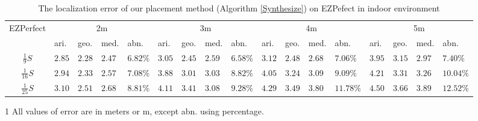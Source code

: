 \documentclass[10pt, conference, letterpaper]{IEEEtran}
\begin{document}
\begin{table*}[!t]
\renewcommand{\arraystretch}{1.0}
\caption{The localization error of our placement method (Algorithm \ref{Synthesize}) on EZPefect in indoor environment} \label{experiment_error_EZPefect}
\centering
\begin{threeparttable}
\begin{tabular}{|c|p{0.5cm}|p{0.5cm}|p{0.5cm}|p{0.6cm}|p{0.5cm}|p{0.5cm}|p{0.5cm}|p{0.6cm}|p{0.5cm}|p{0.5cm}|p{0.5cm}|p{0.6cm}|p{0.5cm}|p{0.5cm}|p{0.5cm}|p{0.6cm}|}
  \hline
\multirow{2}{*}{EZPerfect} & \multicolumn{4}{c|}{2m} & \multicolumn{4}{c|}{3m} & \multicolumn{4}{c|}{4m} & \multicolumn{4}{c|}{5m} \\
  \cline{2-17} & ari. & geo. & med. & abn. & ari. & geo. & med. & abn. & ari. & geo. & med. & abn. & ari. & geo. & med. & abn. \\
  \hline
  $\frac{1}{9}S$ & $2.85$ & $2.28$ & $2.47$ & $6.82\%$ & $3.05$ & $2.45$ & $2.59$ & $6.58\%$ & $3.12$ & $2.48$ & $2.68$ & $7.06\%$ & $3.95$ & $3.15$ & $2.97$ & $7.40\%$ \\
  \hline
  $\frac{1}{16}S$ & $2.94$ & $2.33$ & $2.57$ & $7.08\%$ & $3.88$ & $3.01$ & $3.03$ & $8.82\%$ & $4.05$ & $3.24$ & $3.09$ & $9.09\%$ & $4.21$ & $3.31$ & $3.26$ & $10.04\%$ \\
  \hline
  $\frac{1}{25}S$ & $3.10$ & $2.51$ & $2.68$ & $8.81\%$ & $4.11$ & $3.41$ & $3.08$ & $9.28\%$ & $4.29$ & $3.49$ & $3.80$ & $11.78\%$ & $4.50$ & $3.66$ & $3.89$ & $12.52\%$ \\
  \hline
\end{tabular}
\begin{tablenotes}
    \footnotesize
    \item[1] All values of error are in meters or m, except abn. using percentage.
\end{tablenotes}
\end{threeparttable}
\end{table*}
\end{document}
